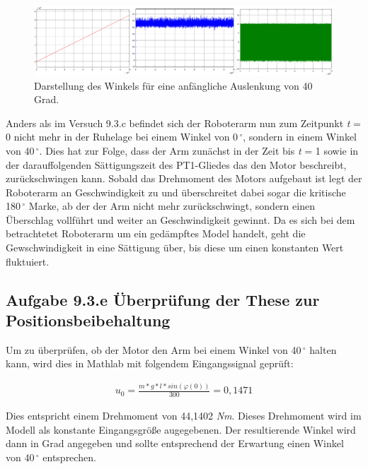 \documentclass[10pt]{scrartcl}
\begin{document}
\begin{figure}[H]
	\centering
	\includegraphics[width=1.2\textwidth]{Theoretischer Teil/Aufgabe9c.png}
	\caption{Darstellung des Winkels für eine anfängliche Auslenkung von 40 Grad. }
	\label{img:grafik-dummy}
\end{figure}

Anders als im Versuch 9.3.c befindet sich der Roboterarm nun zum Zeitpunkt \textit t = 0 nicht mehr in der Ruhelage bei einem Winkel von 0\,$^\circ$, 
sondern in einem Winkel von 40\,$^\circ$. Dies hat zur Folge, dass der Arm zunächst in der Zeit bis  \textit t = 1 sowie in der darauffolgenden Sättigungszeit des PT1-Gliedes das den Motor beschreibt, zurückschwingen kann.
Sobald das Drehmoment des Motors aufgebaut ist legt der Roboterarm an Geschwindigkeit zu und überschreitet dabei sogar die kritische 180\,$^\circ$
Marke, ab der der Arm nicht mehr zurückschwingt, sondern einen Überschlag vollführt und weiter an Geschwindigkeit gewinnt.
Da es sich bei dem betrachtetet Roboterarm um ein gedämpftes Model handelt, geht die Gewschwindigkeit in eine Sättigung über, bis diese um
einen konstanten Wert fluktuiert. 




\subsection{Aufgabe 9.3.e Überprüfung der These zur Positionsbeibehaltung}

Um zu überprüfen, ob der Motor den Arm bei einem Winkel von 40\,$^\circ$ halten kann, wird dies in Mathlab mit folgendem Eingangssignal geprüft:

\begin{align}
   u_0 = \frac{m*g*l* sin( \varphi (0))}{300} = 0,1471
\end{align}

Dies entspricht einem Drehmoment von 44,1402 \textit {Nm}. Dieses Drehmoment wird im Modell als konstante Eingangsgröße augegebenen. Der resultierende Winkel wird dann in Grad angegeben und sollte entsprechend der Erwartung einen Winkel von 40\,$^\circ$ entsprechen.
\end{document}
